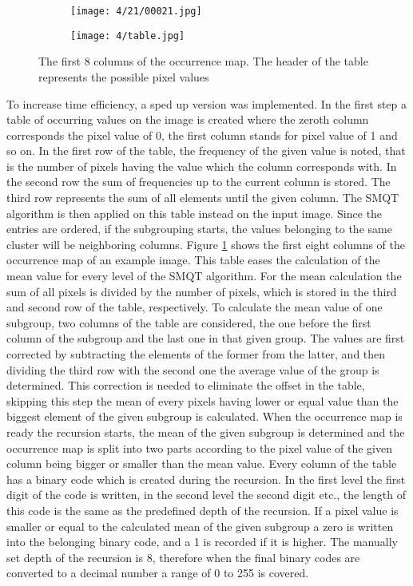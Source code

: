 \documentclass[draft,final]{vutinfth} %
\begin{document}
\begin{figure}[h]
  \centering
  \begin{subfigure}[t]{0.09\columnwidth}
    \centering
    \texttt{[image: 4/21/00021.jpg]}
  \end{subfigure}
  \begin{subfigure}[t]{0.9\columnwidth}
    \centering
    \texttt{[image: 4/table.jpg]}
  \end{subfigure}
  \caption{The first 8 columns of the occurrence map. The header of the table represents the possible pixel values }
  \label{fig:fans:table} %
\end{figure}
\par
To increase time efficiency, a sped up version was implemented.
In the first step a table of occurring values on the image is created where the zeroth column corresponds the pixel value of 0, the first column stands for pixel value of 1 and so on.
In the first row of the table, the frequency of the given value is noted, that is the number of pixels having the value which the column corresponds with.
In the second row the sum of frequencies up to the current column is stored.
The third row represents the sum of all elements until the given column.
The SMQT algorithm is then applied on this table instead on the input image.
Since the entries are ordered, if the subgrouping starts, the values belonging to the same cluster will be neighboring columns.
Figure \ref{fig:fans:table} shows the first eight columns of the occurrence map of an example image.
This table eases the calculation of the mean value for every level of the SMQT algorithm.
For the mean calculation the sum of all pixels is divided by the number of pixels, which is stored in the third and second row of the table, respectively. 
To calculate the mean value of one subgroup, two columns of the table are considered, the one before the first column of the subgroup and the last one in that given group.
The values are first corrected by subtracting the elements of the former from the latter, and then dividing the third row with the second one the average value of the group is determined.
This correction is needed to eliminate the offset in the table, skipping this step the mean of every pixels having lower or equal value than the biggest element of the given subgroup is calculated.
When the occurrence map is ready the recursion starts, the mean of the given subgroup is determined and the occurrence map is split into two parts according to the pixel value of the given column being bigger or smaller than the mean value. 
Every column of the table has a binary code which is created during the recursion.
In the first level the first digit of the code is written, in the second level the second digit etc., the length of this code is the same as the predefined depth of the recursion.
If a pixel value is smaller or equal to the calculated mean of the given subgroup a zero is written into the belonging binary code, and a 1 is recorded if it is higher.
The manually set depth of the recursion is 8, therefore when the final binary codes are converted to a decimal number a range of 0 to 255 is covered.
\end{document}
